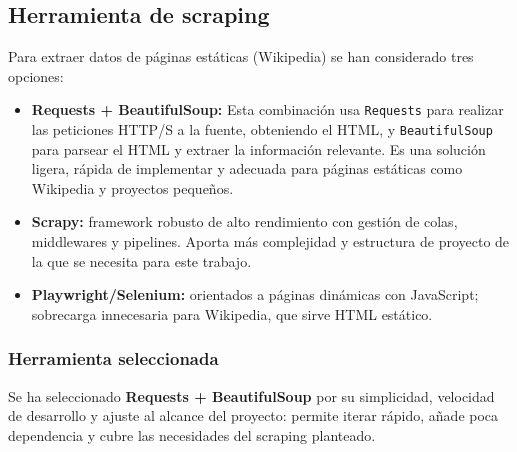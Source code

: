 \subsection{Herramienta de scraping}\label{sec:scraping}
Para extraer datos de páginas estáticas (Wikipedia) se han considerado tres opciones:

\begin{itemize}
  \item \textbf{Requests + BeautifulSoup:} Esta combinación usa \texttt{Requests} para realizar las peticiones 
  HTTP/S a la fuente, obteniendo el HTML, y \texttt{BeautifulSoup} para parsear el HTML y extraer la información 
  relevante. Es una solución ligera, rápida de implementar y adecuada para páginas estáticas como Wikipedia y
  proyectos pequeños.
  \item \textbf{Scrapy:} framework robusto de alto rendimiento con gestión de colas, middlewares y pipelines.
  Aporta más complejidad y estructura de proyecto de la que se necesita para este trabajo.
  \item \textbf{Playwright/Selenium:} orientados a páginas dinámicas con JavaScript; sobrecarga innecesaria para 
  Wikipedia, que sirve HTML estático.
\end{itemize}

\subsubsection{Herramienta seleccionada}
Se ha seleccionado \textbf{Requests + BeautifulSoup} por su simplicidad, velocidad de desarrollo y ajuste al alcance 
del proyecto: permite iterar rápido, añade poca dependencia y cubre las necesidades del scraping planteado.